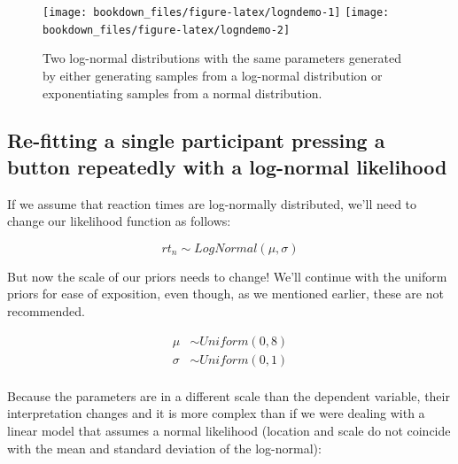\documentclass[12pt,]{krantz}
\theoremstyle{definition}
\theoremstyle{definition}
\theoremstyle{definition}
\theoremstyle{remark}
\begin{document}
\begin{figure}
\texttt{[image: bookdown\_files/figure-latex/logndemo-1]} \texttt{[image: bookdown\_files/figure-latex/logndemo-2]} \caption{Two log-normal distributions with the same parameters generated by either generating samples from a log-normal distribution or exponentiating samples from a normal distribution.}\label{fig:logndemo}
\end{figure}

\hypertarget{sec:lognormal}{%
\subsection{Re-fitting a single participant pressing a button repeatedly with a log-normal likelihood}\label{sec:lognormal}}

If we assume that reaction times are log-normally distributed, we'll need to change our likelihood function as follows:

\begin{equation}
rt_n \sim LogNormal(\mu,\sigma)
\end{equation}

But now the scale of our priors needs to change! We'll continue with the uniform priors for ease of exposition, even though, as we mentioned earlier, these are not recommended.

\begin{equation}
\begin{aligned}
\mu &\sim Uniform(0, 8) \\
\sigma &\sim Uniform(0, 1) \\
\end{aligned}
\label{eq:logpriorsunif}
\end{equation}

Because the parameters are in a different scale than the dependent variable, their interpretation changes and it is more complex than if we were dealing with a linear model that assumes a normal likelihood (location and scale do not coincide with the mean and standard deviation of the log-normal):
\end{document}
